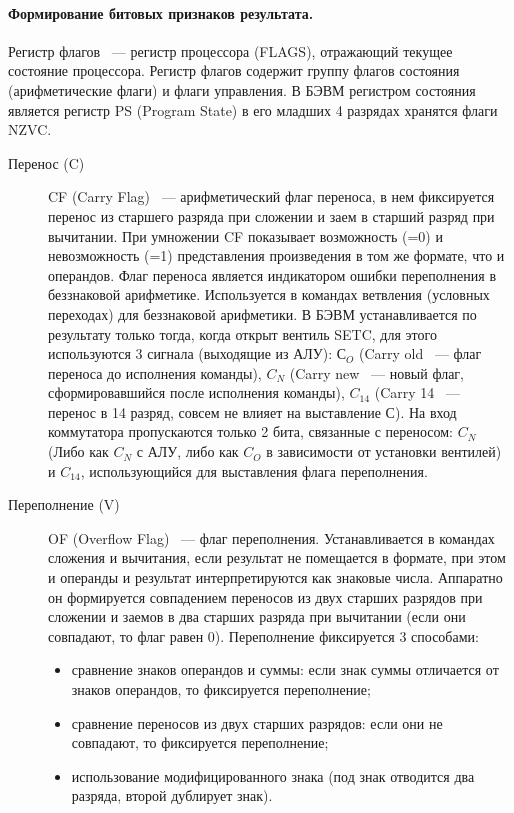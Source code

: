 \documentclass[10pt]{article}
\begin{document}
	\paragraph{Формирование битовых признаков результата.}
	Регистр флагов ~--- регистр процессора (FLAGS), отражающий текущее состояние процессора. Регистр флагов содержит группу флагов состояния (арифметические флаги) и флаги управления. В БЭВМ регистром состояния является регистр PS (Program State) в его младших 4 разрядах хранятся флаги NZVC.
	\begin{description}
		\item[Перенос (C)] CF (Carry Flag) ~--- арифметический флаг переноса, в нем фиксируется перенос из старшего разряда при сложении и заем в старший разряд при вычитании. При умножении CF показывает возможность (=0) и невозможность (=1) представления произведения в том же формате, что и операндов. Флаг переноса является индикатором ошибки переполнения в беззнаковой арифметике. Используется в командах ветвления (условных переходах) для беззнаковой арифметики. В БЭВМ устанавливается по результату только тогда, когда открыт вентиль SETC, для этого используются 3 сигнала (выходящие из АЛУ): $С_O$ (Carry old ~--- флаг переноса до исполнения команды), $C_N$ (Carry new ~--- новый флаг, сформировавшийся после исполнения команды), $C_{14}$ (Carry 14 ~--- перенос в 14 разряд, совсем не влияет на выставление $С$). На вход коммутатора пропускаются только 2 бита, связанные с переносом: $C_N$ (Либо как $C_N$ с АЛУ, либо как $C_O$ в зависимости от установки вентилей) и $C_{14}$, использующийся для выставления флага переполнения.
		\item[Переполнение (V)] OF (Overflow Flag) ~--- флаг переполнения. Устанавливается в командах сложения и вычитания, если результат не помещается в формате, при этом и операнды и результат интерпретируются как знаковые числа. Аппаратно он формируется совпадением переносов из двух старших разрядов при сложении и заемов в два старших разряда при вычитании (если они совпадают, то флаг равен 0). Переполнение фиксируется 3 способами:
		\begin{itemize}
			\item сравнение знаков операндов и суммы: если знак суммы отличается от знаков операндов, то фиксируется переполнение;
			\item сравнение переносов из двух старших разрядов: если они не совпадают, то фиксируется переполнение;
			\item использование модифицированного знака (под знак отводится два разряда, второй дублирует знак).

\end{itemize}
\end{description}
\end{document}
